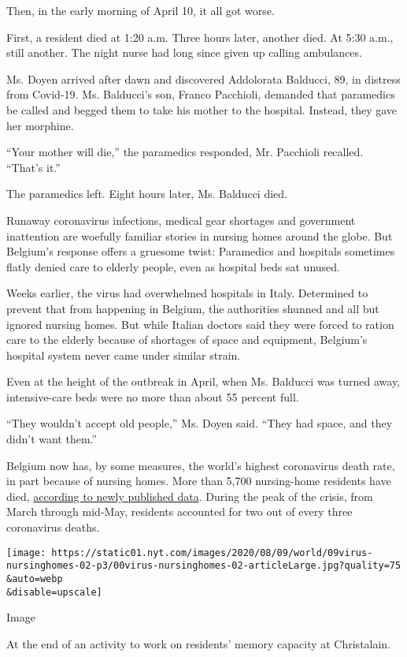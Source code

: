 Then, in the early morning of April 10, it all got worse.

First, a resident died at 1:20 a.m. Three hours later, another died. At
5:30 a.m., still another. The night nurse had long since given up
calling ambulances.

Ms. Doyen arrived after dawn and discovered Addolorata Balducci, 89, in
distress from Covid-19. Ms. Balducci's son, Franco Pacchioli, demanded
that paramedics be called and begged them to take his mother to the
hospital. Instead, they gave her morphine.

``Your mother will die,'' the paramedics responded, Mr. Pacchioli
recalled. ``That's it.''

The paramedics left. Eight hours later, Ms. Balducci died.

Runaway coronavirus infections, medical gear shortages and government
inattention are woefully familiar stories in nursing homes around the
globe. But Belgium's response offers a gruesome twist: Paramedics and
hospitals sometimes flatly denied care to elderly people, even as
hospital beds sat unused.

Weeks earlier, the virus had overwhelmed hospitals in Italy. Determined
to prevent that from happening in Belgium, the authorities shunned and
all but ignored nursing homes. But while Italian doctors said they were
forced to ration care to the elderly because of shortages of space and
equipment, Belgium's hospital system never came under similar strain.

Even at the height of the outbreak in April, when Ms. Balducci was
turned away, intensive-care beds were no more than about 55 percent
full.

``They wouldn't accept old people,'' Ms. Doyen said. ``They had space,
and they didn't want them.''

Belgium now has, by some measures, the world's highest coronavirus death
rate, in part because of nursing homes. More than 5,700 nursing-home
residents have died,
\href{https://www.medrxiv.org/content/10.1101/2020.06.20.20136234v1.full.pdf}{according
to newly published data}. During the peak of the crisis, from March
through mid-May, residents accounted for two out of every three
coronavirus deaths.

\texttt{[image: https://static01.nyt.com/images/2020/08/09/world/09virus-nursinghomes-02-p3/00virus-nursinghomes-02-articleLarge.jpg?quality=75\\\&auto=webp\\\&disable=upscale]}

Image

At the end of an activity to work on residents' memory capacity at
Christalain.

